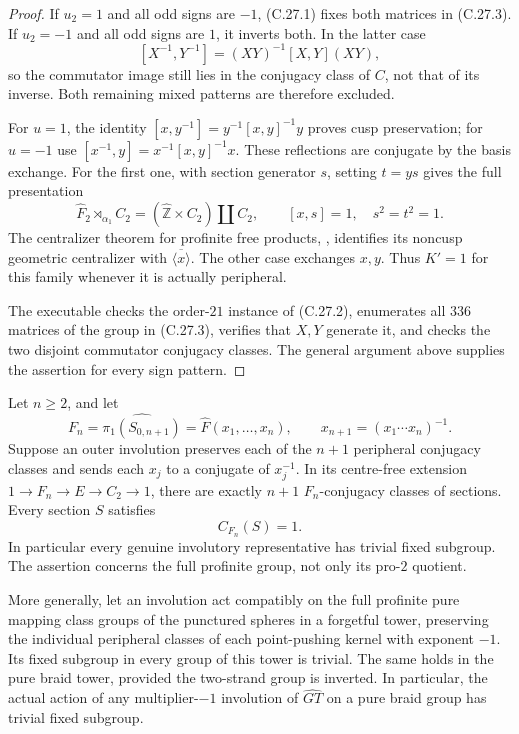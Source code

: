 \begin{proof}
If $u_2=1$ and all odd signs are $-1$, (C.27.1) fixes
both matrices in (C.27.3).  If $u_2=-1$ and all odd
signs are $1$, it inverts both.  In the latter case
\[
 [X^{-1},Y^{-1}]=(XY)^{-1}[X,Y](XY),
\]
so the commutator image still lies in the conjugacy
class of $C$, not that of its inverse.  Both remaining
mixed patterns are therefore excluded.

For $u=1$, the identity
$[x,y^{-1}]=y^{-1}[x,y]^{-1}y$ proves cusp preservation;
for $u=-1$ use
$[x^{-1},y]=x^{-1}[x,y]^{-1}x$.
These reflections are conjugate by the basis exchange.
For the first one, with section generator $s$, setting
$t=ys$ gives the full presentation
\[
 \widehat F_2\rtimes_{\alpha_1} C_2
       =(\widehat{\mathbb Z}\times C_2)\amalg C_2,
 \qquad [x,s]=1,\quad s^2=t^2=1.
\]
The centralizer theorem for profinite free products,
\cite[Theorem B']{A_HR1985}, identifies its noncusp
geometric centralizer with $\overline{\langle x\rangle}$.
The other case exchanges $x,y$.  Thus $K'=1$ for
this family whenever it is actually peripheral.

The executable 
checks the order-$21$ instance of (C.27.2), enumerates
all $336$ matrices of the group in (C.27.3), verifies
that $X,Y$ generate it, and checks the two disjoint
commutator conjugacy classes.  The general argument
above supplies the assertion for every sign pattern.
\end{proof}

Let $n\geq2$, and let
\[
 F_n=\widehat{\pi_1(S_{0,n+1})}
   =\widehat F(x_1,\ldots,x_n),\qquad
 x_{n+1}=(x_1\cdots x_n)^{-1}.
\]
Suppose an outer involution preserves each of the $n+1$
peripheral conjugacy classes and sends each $x_j$ to a
conjugate of $x_j^{-1}$.  In its centre-free extension
$1\to F_n\to E\to C_2\to1$, there are exactly $n+1$
$F_n$-conjugacy classes of sections.  Every section
$S$ satisfies
\[
                         C_{F_n}(S)=1.                 \tag{C.28.1}
\]
In particular every genuine involutory representative has
trivial fixed subgroup.  The assertion concerns the full
profinite group, not only its pro-$2$ quotient.

More generally, let an involution act compatibly on the full
profinite pure mapping class groups of the punctured spheres
in a forgetful tower, preserving the individual peripheral
classes of each point-pushing kernel with exponent $-1$.
Its fixed subgroup in every group of this tower is trivial.
The same holds in the pure braid tower, provided the
two-strand group is inverted.  In particular, the actual
action of any multiplier-$-1$ involution of
$\widehat{GT}$ on a pure braid group has trivial fixed
subgroup.

